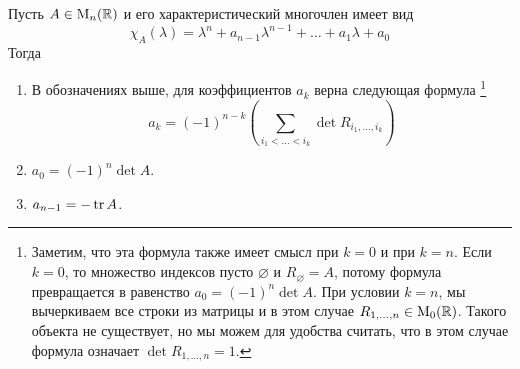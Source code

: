 \begin{claim}
\label{claim::CharCoefs}
Пусть $A\in\operatorname{M}_{n}(\mathbb R)$ и его характеристический многочлен имеет вид 
\[
\chi_A(\lambda) = \lambda^n + a_{n-1}\lambda^{n-1} + \ldots + a_1 \lambda + a_0
\]
Тогда
\begin{enumerate}
\item В обозначениях выше, для коэффициентов $a_k$ верна следующая формула%
\footnote{Заметим, что эта формула также имеет смысл при $k=0$ и при $k = n$.
Если $k = 0$, то множество индексов пусто $\varnothing$ и $R_\varnothing = A$, потому формула превращается в равенство $a_0 = (-1)^n\det A$.
При условии $k = n$, мы вычеркиваем все строки из матрицы и в этом случае $R_{1,\ldots,n}\in\operatorname{M}_{0}(\mathbb R)$.
Такого объекта не существует, но мы можем для удобства считать, что в этом случае формула означает $\det R_{1,\ldots,n} = 1$.}
\[
a_{k} = (-1)^{n-k}\left(\sum_{i_1<\ldots<i_k}\det R_{i_1,\ldots,i_k}\right)
\]

\item $a_0 = (-1)^n\det A$.

\item $a_{n-1} =  - \operatorname{tr} A$.
\end{enumerate}
\end{claim}
